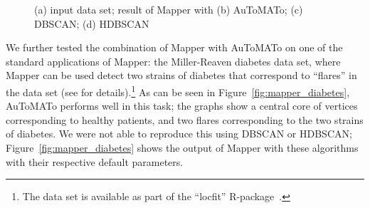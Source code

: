 \documentclass[10pt]{article} %
\theoremstyle{plain}
\newcommand{\aut}{AuToMATo\xspace}
\begin{document}
\begin{figure}[ht]
    \centering
    \begin{subfigure}[c]{0.23\textwidth}
        \centering
        
        \caption{}
        \label{fig:concentric_circles}
    \end{subfigure}
    \hfill
    \begin{subfigure}[c]{0.25\textwidth}
        \centering
        
        \caption{}
        \label{fig:mapper_concentric_circles_automato}
    \end{subfigure}
    \hfill
    \begin{subfigure}[c]{0.25\textwidth}
        \centering
        
        \caption{}
        \label{fig:mapper_concentric_circles_dbscan}
    \end{subfigure}
    \hfill
    \begin{subfigure}[c]{0.25\textwidth}
        \centering
        
        \caption{}
        \label{fig:mapper_concentric_circles_hdbscan}
    \end{subfigure}
    \caption{(a) input data set; result of Mapper with (b) \aut; (c) DBSCAN; (d) HDBSCAN}
    \label{fig:mapper_concentric_circles}
\end{figure}

We further tested the combination of Mapper with \aut on one of the standard applications of Mapper: the Miller-Reaven diabetes data set, where Mapper can be used detect two strains of diabetes that correspond to ``flares'' in the data set (see \citet[Section 5.1]{singh2007topological} for details).\footnote{The data set is available as part of the ``locfit'' R-package~\citep{locfit_package}.} As can be seen in Figure~\ref{fig:mapper_diabetes}, \aut performs well in this task; the graphs show a central core of vertices corresponding to healthy patients, and two flares corresponding to the two strains of diabetes. We were not able to reproduce this using DBSCAN or HDBSCAN; Figure~\ref{fig:mapper_diabetes} shows the output of Mapper with these algorithms with their respective default parameters.
\end{document}
